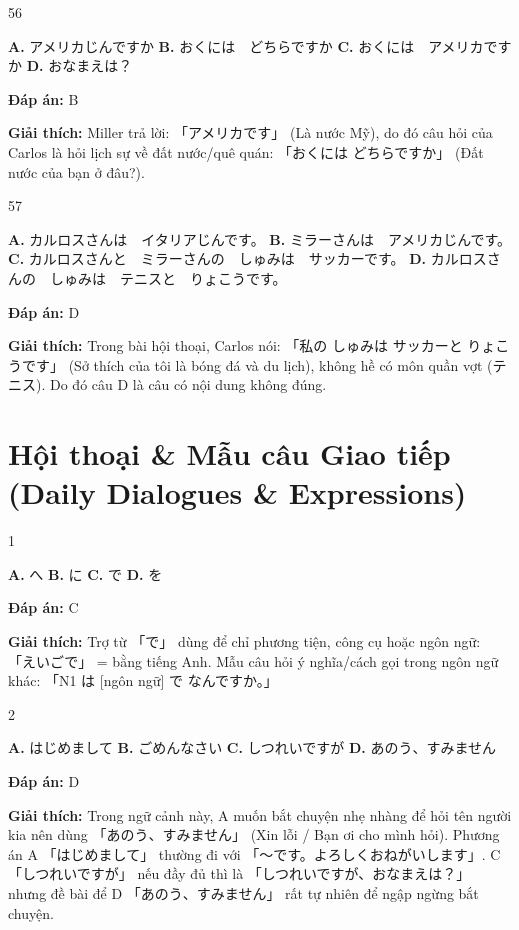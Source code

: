\documentclass[12pt,a4paper]{report}
\newcommand{\source}[1]{}
\newcommand{\choice}[2]{\textbf{#1.} #2 \quad}
\newcommand{\answer}[1]{\par\textbf{Đáp án:} #1}
\newcommand{\confidence}[1]{}
\newcommand{\explain}[1]{\par\textbf{Giải thích:} #1\vspace{0.5cm}}
\begin{document}
\begin{question}{56}
\source{Q29.webp}
\choice{A}{アメリカじんですか}
\choice{B}{おくには　どちらですか}
\choice{C}{おくには　アメリカですか}
\choice{D}{おなまえは？}
\answer{B}
\confidence{high}
\explain{Miller trả lời: 「アメリカです」 (Là nước Mỹ), do đó câu hỏi của Carlos là hỏi lịch sự về đất nước/quê quán: 「おくには どちらですか」 (Đất nước của bạn ở đâu?).}
\end{question}

\begin{question}{57}
\source{Q30.webp}
\choice{A}{カルロスさんは　イタリアじんです。}
\choice{B}{ミラーさんは　アメリカじんです。}
\choice{C}{カルロスさんと　ミラーさんの　しゅみは　サッカーです。}
\choice{D}{カルロスさんの　しゅみは　テニスと　りょこうです。}
\answer{D}
\confidence{high}
\explain{Trong bài hội thoại, Carlos nói: 「私の しゅみは サッカーと りょこうです」 (Sở thích của tôi là bóng đá và du lịch), không hề có môn quần vợt (テニス). Do đó câu D là câu có nội dung không đúng.}
\end{question}

\chapter{Hội thoại \& Mẫu câu Giao tiếp (Daily Dialogues \& Expressions)}

\begin{question}{1}
\source{Q3_116_20251121082803.webp}
\choice{A}{へ}
\choice{B}{に}
\choice{C}{で}
\choice{D}{を}
\answer{C}
\confidence{high}
\explain{Trợ từ 「で」 dùng để chỉ phương tiện, công cụ hoặc ngôn ngữ: 「えいごで」 = bằng tiếng Anh. Mẫu câu hỏi ý nghĩa/cách gọi trong ngôn ngữ khác: 「N1 は [ngôn ngữ] で なんですか。」}
\end{question}

\begin{question}{2}
\source{Q4_31_20251121082805.webp}
\choice{A}{はじめまして}
\choice{B}{ごめんなさい}
\choice{C}{しつれいですが}
\choice{D}{あのう、すみません}
\answer{D}
\confidence{high}
\explain{Trong ngữ cảnh này, A muốn bắt chuyện nhẹ nhàng để hỏi tên người kia nên dùng 「あのう、すみません」 (Xin lỗi / Bạn ơi cho mình hỏi). Phương án A 「はじめまして」 thường đi với 「〜です。よろしくおねがいします」. C 「しつれいですが」 nếu đầy đủ thì là 「しつれいですが、おなまえは？」 nhưng đề bài để D 「あのう、すみません」 rất tự nhiên để ngập ngừng bắt chuyện.}
\end{question}
\end{document}
